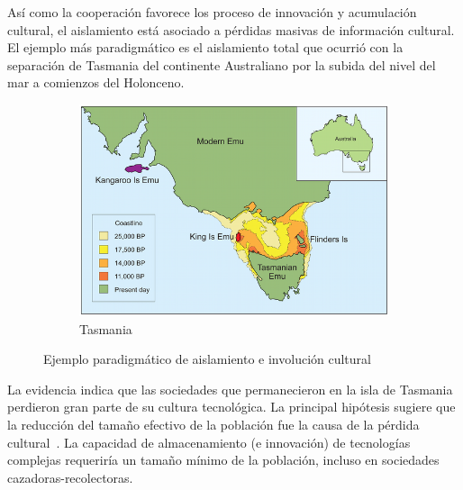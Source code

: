 \documentclass[a4paper,11pt]{book}
\theoremstyle{definition}
\begin{document}
As\'i como la cooperación favorece los proceso de innovaci\'on y acumulaci\'on cultural, el aislamiento está asociado a p\'erdidas masivas de informaci\'on cultural.
%
El ejemplo más paradigm\'atico es el aislamiento total que ocurrió con la separaci\'on de Tasmania del continente Australiano por la subida del nivel del mar a comienzos del Holonceno.
%
\begin{figure}[ht!]
  \centering
  \begin{subfigure}[c]{0.42\textwidth}
    \includegraphics[width=\textwidth]{static/tasmania.png}
    \caption{Tasmania}
    \label{fig:tasmania}
  \end{subfigure}
  \caption{Ejemplo paradigmático de aislamiento e involución cultural}
  \label{fig:aislamiento}
\end{figure}
La evidencia indica que las sociedades que permanecieron en la isla de Tasmania perdieron gran parte de su cultura tecnol\'ogica.
%
La principal hip\'otesis sugiere que la reducci\'on del tama\~no efectivo de la poblaci\'on fue la causa de la p\'erdida cultural~\cite{Henrich2004}.
%
La capacidad de almacenamiento (e innovaci\'on) de tecnolog\'ias complejas requerir\'ia un tama\~no m\'inimo de la poblaci\'on, incluso en sociedades cazadoras-recolectoras.

\end{document}
